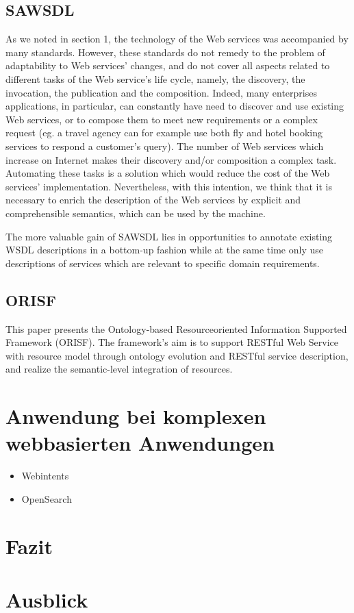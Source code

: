 \documentclass[10pt,a4paper]{article}
\begin{document}
\subsection{SAWSDL}

As we noted in section 1, the technology of the Web
services was accompanied by many standards. However,
these standards do not remedy to the problem of adaptability
to Web services’ changes, and do not cover all aspects related
to different tasks of the Web service’s life cycle, namely, the
discovery, the invocation, the publication and the
composition. Indeed, many enterprises applications, in
particular, can constantly have need to discover and use
existing Web services, or to compose them to meet new
requirements or a complex request (eg. a travel agency can
for example use both fly and hotel booking services to
respond a customer’s query). The number of Web services
which increase on Internet makes their discovery and/or
composition a complex task. Automating these tasks is a
solution which would reduce the cost of the Web services’
implementation. Nevertheless, with this intention, we think
that it is necessary to enrich the description of the Web
services by explicit and comprehensible semantics, which can
be used by the machine. \cite{ei-sawsdl}

The more valuable
gain of SAWSDL lies in opportunities to annotate existing
WSDL descriptions in a bottom-up fashion while at the
same time only use descriptions of services which are relevant
to specific domain requirements. \cite{WSMOLITE}

\subsection{ORISF}

This paper presents the Ontology-based Resourceoriented
Information Supported Framework (ORISF). The
framework’s aim is to support RESTful Web Service with
resource model through ontology evolution and RESTful
service description, and realize the semantic-level
integration of resources. \cite{zg-ontorest}

\section{Anwendung bei komplexen webbasierten Anwendungen}
\label{l:verwendung}


\begin{itemize}
\item Webintents
\item OpenSearch
\end{itemize}

\section{Fazit}
\label{l:fazit}
\section{Ausblick}
\label{l:ausblick}
\pagebreak


\end{document}
